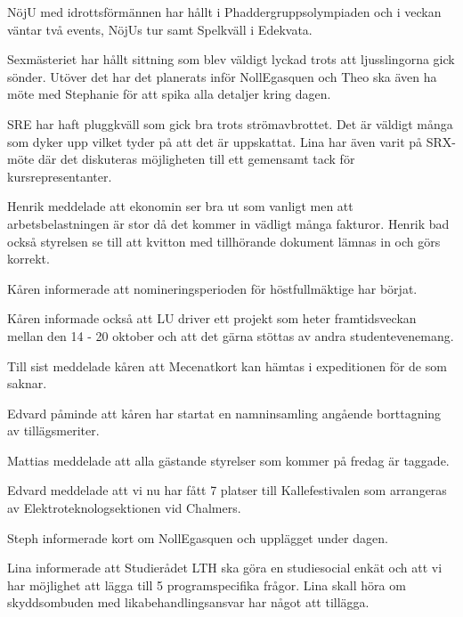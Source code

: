 \documentclass[10pt]{article}
\begin{document}
\begin{paragrafer}
\begin{paragrafer}
NöjU med idrottsförmännen har hållt i Phaddergruppsolympiaden och i veckan väntar två events, NöjUs tur samt Spelkväll i Edekvata. 

Sexmästeriet har hållt sittning som blev väldigt lyckad trots att ljusslingorna gick sönder. Utöver det har det planerats inför NollEgasquen och Theo ska även ha möte med Stephanie för att spika alla detaljer kring dagen. 

SRE har haft pluggkväll som gick bra trots strömavbrottet. Det är väldigt många som dyker upp vilket tyder på att det är uppskattat. Lina har även varit på SRX-möte där det diskuteras möjligheten till ett gemensamt tack för kursrepresentanter. 

Henrik meddelade att ekonomin ser bra ut som vanligt men att arbetsbelastningen är stor då det kommer in vädligt många fakturor. Henrik bad också styrelsen se till att kvitton med tillhörande dokument lämnas in och görs korrekt. 


Kåren informerade att nomineringsperioden för höstfullmäktige har börjat. 

Kåren informade också att LU driver ett projekt som heter framtidsveckan mellan den 14 - 20 oktober och att det gärna stöttas av andra studentevenemang.

Till sist meddelade kåren att Mecenatkort kan hämtas i expeditionen för de som saknar. 

Edvard påminde att kåren har startat en namninsamling angående borttagning av tillägsmeriter. 

Mattias meddelade att alla gästande styrelser som kommer på fredag är taggade. 

Edvard meddelade att vi nu har fått 7 platser till Kallefestivalen som arrangeras av Elektroteknologsektionen vid Chalmers.

\end{paragrafer}


Steph informerade kort om NollEgasquen och upplägget under dagen. 


Lina informerade att Studierådet LTH ska göra en studiesocial enkät och att vi har möjlighet att lägga till 5 programspecifika frågor. 
Lina skall höra om skyddsombuden med likabehandlingsansvar har något att tillägga. 


\end{paragrafer}
\end{document}
